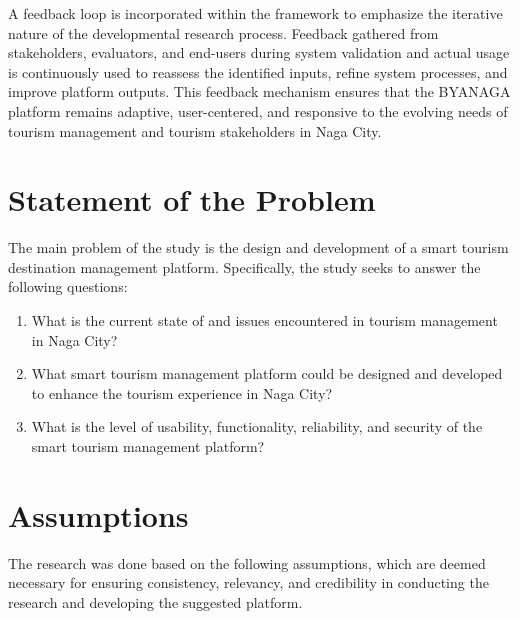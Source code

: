 \documentclass{research}
\begin{document}
A feedback loop is incorporated within the framework to emphasize the iterative nature of the developmental research process. Feedback gathered from stakeholders, evaluators, and end-users during system validation and actual usage is continuously used to reassess the identified inputs, refine system processes, and improve platform outputs. This feedback mechanism ensures that the BYANAGA platform remains adaptive, user-centered, and responsive to the evolving needs of tourism management and tourism stakeholders in Naga City.

\section{Statement of the Problem}

The main problem of the study is the design and development of a smart tourism destination management platform. Specifically, the study seeks to answer the following questions:

\begin{enumerate}
    \item What is the current state of and issues encountered in tourism management in Naga City?
    \item What smart tourism management platform could be designed and developed to enhance the tourism experience in Naga City?
    \item What is the level of usability, functionality, reliability, and security of the smart tourism management platform?
\end{enumerate}

\section{Assumptions}

The research was done based on the following assumptions, which are deemed necessary for ensuring consistency, relevancy, and credibility in conducting the research and developing the suggested platform.
\end{document}
